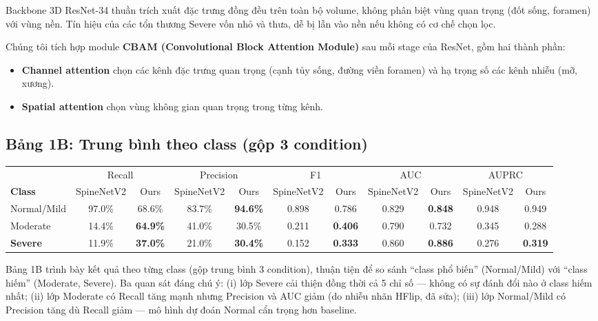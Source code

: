 \documentclass[11pt,a4paper]{article}
\newcommand{\good}[1]{\textcolor{good}{\textbf{#1}}}
\newcommand{\bad}[1]{\textcolor{bad}{#1}}
\begin{document}
\noindent Backbone 3D ResNet-34 thuần trích xuất đặc trưng đồng đều trên toàn bộ volume, không phân biệt vùng quan trọng (đốt sống, foramen) với vùng nền. Tín hiệu của các tổn thương Severe vốn nhỏ và thưa, dễ bị lẫn vào nền nếu không có cơ chế chọn lọc.

\noindent Chúng tôi tích hợp module \textbf{CBAM (Convolutional Block Attention Module)} sau mỗi stage của ResNet, gồm hai thành phần:
\begin{itemize}
\itemsep 1pt
\item \textbf{Channel attention} chọn các kênh đặc trưng quan trọng (cạnh tủy sống, đường viền foramen) và hạ trọng số các kênh nhiễu (mỡ, xương).
\item \textbf{Spatial attention} chọn vùng không gian quan trọng trong từng kênh.
\end{itemize}

\subsection*{Bảng 1B: Trung bình theo class (gộp 3 condition)}

\noindent\scriptsize
\begin{tabular}{@{}lcccccccccc@{}}
\toprule
\rowcolor{tablehdr}
& \multicolumn{2}{c}{Recall} & \multicolumn{2}{c}{Precision} & \multicolumn{2}{c}{F1} & \multicolumn{2}{c}{AUC} & \multicolumn{2}{c}{AUPRC} \\
\cmidrule(lr){2-3} \cmidrule(lr){4-5} \cmidrule(lr){6-7} \cmidrule(lr){8-9} \cmidrule(lr){10-11}
\textbf{Class} & SpineNetV2 & Ours & SpineNetV2 & Ours & SpineNetV2 & Ours & SpineNetV2 & Ours & SpineNetV2 & Ours \\
\midrule
Normal/Mild & 97.0\% & \bad{68.6\%} & 83.7\% & \good{94.6\%} & 0.898 & 0.786 & 0.829 & \good{0.848} & 0.948 & 0.949 \\
Moderate & 14.4\% & \good{64.9\%} & 41.0\% & \bad{30.5\%} & 0.211 & \good{0.406} & 0.790 & \bad{0.732} & 0.345 & \bad{0.288} \\
\textbf{Severe} & 11.9\% & \good{37.0\%} & 21.0\% & \good{30.4\%} & 0.152 & \good{0.333} & 0.860 & \good{0.886} & 0.276 & \good{0.319} \\
\bottomrule
\end{tabular}
\normalsize

\vspace{0.5em}
\noindent Bảng 1B trình bày kết quả theo từng class (gộp trung bình 3 condition), thuận tiện để so sánh ``class phổ biến'' (Normal/Mild) với ``class hiếm'' (Moderate, Severe). Ba quan sát đáng chú ý: (i) lớp Severe cải thiện đồng thời cả 5 chỉ số --- không có sự đánh đổi nào ở class hiếm nhất; (ii) lớp Moderate có Recall tăng mạnh nhưng Precision và AUC giảm (do nhiễu nhãn HFlip, đã sửa); (iii) lớp Normal/Mild có Precision tăng dù Recall giảm --- mô hình dự đoán Normal cẩn trọng hơn baseline.
\end{document}
